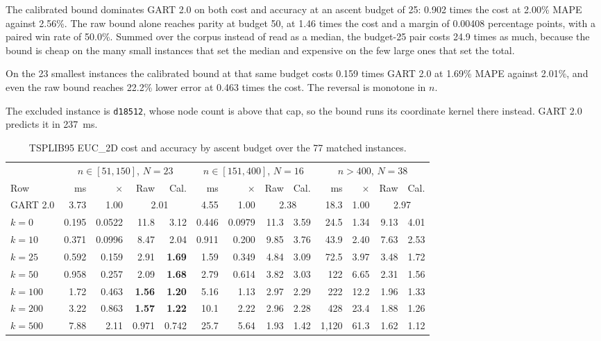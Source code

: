 \documentclass{article}
\begin{document}
The calibrated bound dominates GART 2.0 on both cost and accuracy at an ascent budget of 25: 0.902 times the cost at 2.00\% MAPE against 2.56\%. The raw bound alone reaches parity at budget 50, at 1.46 times the cost and a margin of 0.00408 percentage points, with a paired win rate of 50.0\%. Summed over the corpus instead of read as a median, the budget-25 pair costs 24.9 times as much, because the bound is cheap on the many small instances that set the median and expensive on the few large ones that set the total.

On the 23 smallest instances the calibrated bound at that same budget costs 0.159 times GART 2.0 at 1.69\% MAPE against 2.01\%, and even the raw bound reaches 22.2\% lower error at 0.463 times the cost. The reversal is monotone in $n$.

The excluded instance is \texttt{d18512}, whose node count is above that cap, so the bound runs its coordinate kernel there instead. GART 2.0 predicts it in 237~ms.

\begin{table}[!htbp]
\centering
\caption{TSPLIB95 EUC\_2D cost and accuracy by ascent budget over the 77 matched instances.}
\label{tab:frontier_tsplib}
\setlength{\tabcolsep}{4pt}
\renewcommand{\arraystretch}{1.05}
{\small%
\begin{tabular}{@{}lrrrrrrrrrrrr@{}}
\toprule
 & \multicolumn{4}{c}{$n\in[51,150]$, $N=23$} & \multicolumn{4}{c}{$n\in[151,400]$, $N=16$} & \multicolumn{4}{c}{$n>400$, $N=38$} \\
\cmidrule(lr){2-5}\cmidrule(lr){6-9}\cmidrule(lr){10-13}
Row & ms & $\times$ & Raw & Cal. & ms & $\times$ & Raw & Cal. & ms & $\times$ & Raw & Cal. \\
\midrule
GART 2.0 & 3.73 & 1.00 & \multicolumn{2}{c}{2.01} & 4.55 & 1.00 & \multicolumn{2}{c}{2.38} & 18.3 & 1.00 & \multicolumn{2}{c}{2.97} \\
\midrule
$k=0$ & 0.195 & 0.0522 & 11.8 & 3.12 & 0.446 & 0.0979 & 11.3 & 3.59 & 24.5 & 1.34 & 9.13 & 4.01 \\
$k=10$ & 0.371 & 0.0996 & 8.47 & 2.04 & 0.911 & 0.200 & 9.85 & 3.76 & 43.9 & 2.40 & 7.63 & 2.53 \\
$k=25$ & 0.592 & 0.159 & 2.91 & \textbf{1.69} & 1.59 & 0.349 & 4.84 & 3.09 & 72.5 & 3.97 & 3.48 & 1.72 \\
$k=50$ & 0.958 & 0.257 & 2.09 & \textbf{1.68} & 2.79 & 0.614 & 3.82 & 3.03 & 122 & 6.65 & 2.31 & 1.56 \\
$k=100$ & 1.72 & 0.463 & \textbf{1.56} & \textbf{1.20} & 5.16 & 1.13 & 2.97 & 2.29 & 222 & 12.2 & 1.96 & 1.33 \\
$k=200$ & 3.22 & 0.863 & \textbf{1.57} & \textbf{1.22} & 10.1 & 2.22 & 2.96 & 2.28 & 428 & 23.4 & 1.88 & 1.26 \\
$k=500$ & 7.88 & 2.11 & 0.971 & 0.742 & 25.7 & 5.64 & 1.93 & 1.42 & 1{,}120 & 61.3 & 1.62 & 1.12 \\
\bottomrule
\end{tabular}%
}
\end{table}
\end{document}
